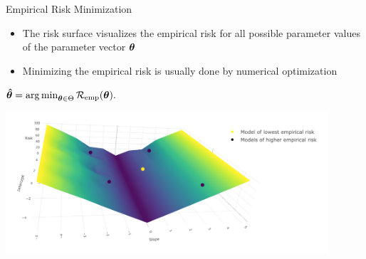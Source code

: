 \documentclass[11pt,compress,t,notes=noshow, xcolor=table]{beamer}
\begin{document}
\begin{vbframe}{Empirical Risk Minimization}

\begin{itemize}
\item \small The risk surface visualizes the empirical risk for all possible parameter values of the parameter vector $\bm{\theta}$
\item \small Minimizing the empirical risk is usually done by numerical optimization
\end{itemize}

\begin{center}
$
\bm{\hat\theta} = \operatorname{arg\,min}_{\bm{\theta} \in \Theta} \mathcal{R}_{\text{emp}}(\bm{\theta}).
$
\end{center}


\begin{center}
 \includegraphics[width = 0.9\textwidth]{figure_man/nutshell-ml-basics-risk-surface.png}
\end{center}





\end{vbframe}
\end{document}
